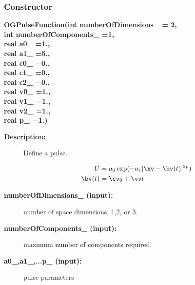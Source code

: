 \subsubsection{Constructor}
 
\newlength{\OGPulseFunctionIncludeArgIndent}
\begin{flushleft} \textbf{%
\settowidth{\OGPulseFunctionIncludeArgIndent}{OGPulseFunction(}%
OGPulseFunction(int numberOfDimensions\_  = 2,\\ 
\hspace{\OGPulseFunctionIncludeArgIndent}int numberOfComponents\_  =1,\\ 
\hspace{\OGPulseFunctionIncludeArgIndent}real a0\_  =1., \\ 
\hspace{\OGPulseFunctionIncludeArgIndent}real a1\_  =5.,\\ 
\hspace{\OGPulseFunctionIncludeArgIndent}real c0\_  =0.,\\ 
\hspace{\OGPulseFunctionIncludeArgIndent}real c1\_  =0.,\\ 
\hspace{\OGPulseFunctionIncludeArgIndent}real c2\_  =0.,\\ 
\hspace{\OGPulseFunctionIncludeArgIndent}real v0\_  =1.,\\ 
\hspace{\OGPulseFunctionIncludeArgIndent}real v1\_  =1.,\\ 
\hspace{\OGPulseFunctionIncludeArgIndent}real v2\_  =1.,\\ 
\hspace{\OGPulseFunctionIncludeArgIndent}real p\_   =1.)
}\end{flushleft}
\begin{description}
\item[{\bf Description:}]  
    
    Define a pulse.

  \begin{align*}
    U &=  a_0 \exp( - a_1 | \xv-\bv(t) |^{2p} )  \\
    \bv(t) &= \cv_0 + \vv t
  \end{align*}

\item[{\bf numberOfDimensions\_ (input):}]  number of space dimensions, 1,2, or 3.
\item[{\bf numberOfComponents\_ (input):}]  maximum number of components required.
\item[{\bf a0\_,a1\_,...p\_ (input):}]  pulse parameters
 

\end{description}
